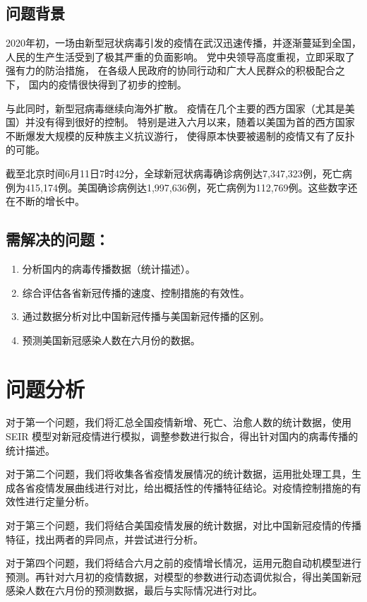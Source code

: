 \documentclass[UTF8]{ctexart}
\begin{document}
\subsection{问题背景} %
\label{sub:问题背景}
2020年初，一场由新型冠状病毒引发的疫情在武汉迅速传播，并逐渐蔓延到全国，
人民的生产生活受到了极其严重的负面影响。
党中央领导高度重视，立即采取了强有力的防治措施，
在各级人民政府的协同行动和广大人民群众的积极配合之下，
国内的疫情很快得到了初步的控制。
\par
与此同时，新型冠病毒继续向海外扩散。
疫情在几个主要的西方国家（尤其是美国）并没有得到很好的控制。
特别是进入六月以来，随着以美国为首的西方国家不断爆发大规模的反种族主义抗议游行，
使得原本快要被遏制的疫情又有了反扑的可能。
\par
截至北京时间6月11日7时42分，全球新冠状病毒确诊病例达7,347,323例，死亡病例为415,174例。美国确诊病例达1,997,636例，死亡病例为112,769例。这些数字还在不断的增长中。


\subsection{需解决的问题：}
\begin{enumerate}
    \item 分析国内的病毒传播数据（统计描述）。 
    \item 综合评估各省新冠传播的速度、控制措施的有效性。 
    \item 通过数据分析对比中国新冠传播与美国新冠传播的区别。
    \item 预测美国新冠感染人数在六月份的数据。 
\end{enumerate}
\section{问题分析}
对于第一个问题，我们将汇总全国疫情新增、死亡、治愈人数的统计数据，使用 SEIR 模型对新冠疫情进行模拟，调整参数进行拟合，得出针对国内的病毒传播的统计描述。
\par 对于第二个问题，我们将收集各省疫情发展情况的统计数据，运用批处理工具，生成各省疫情发展曲线进行对比，给出概括性的传播特征结论。对疫情控制措施的有效性进行定量分析。
\par 对于第三个问题，我们将结合美国疫情发展的统计数据，对比中国新冠疫情的传播特征，找出两者的异同点，并尝试进行分析。
\par 对于第四个问题，我们将结合六月之前的疫情增长情况，运用元胞自动机模型进行预测。再针对六月初的疫情数据，对模型的参数进行动态调优拟合，得出美国新冠感染人数在六月份的预测数据，最后与实际情况进行对比。
\end{document}
